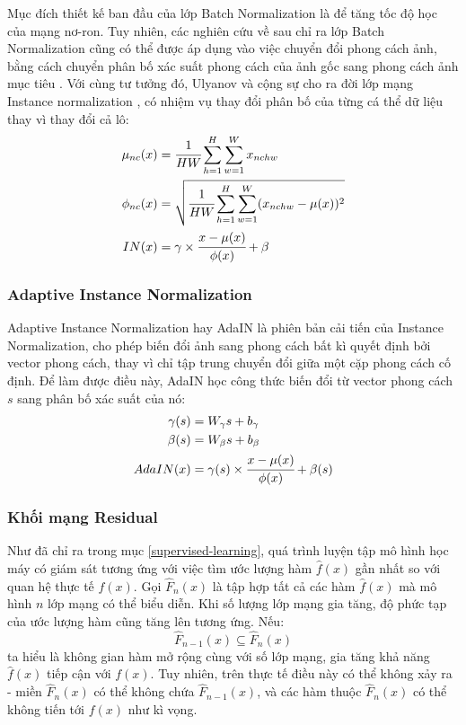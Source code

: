 \documentclass[12pt]{extreport}
\begin{document}
Mục đích thiết kế ban đầu của lớp Batch Normalization là để tăng tốc độ học của mạng nơ-ron. Tuy nhiên, các nghiên cứu về sau chỉ ra lớp Batch Normalization cũng có thể được áp dụng vào việc chuyển đổi phong cách ảnh, bằng cách chuyển phân bố xác suất phong cách của ảnh gốc sang phong cách ảnh mục tiêu \cite{radford2015unsupervised}. Với cùng tư tưởng đó, Ulyanov và cộng sự cho ra đời lớp mạng Instance normalization \cite{DBLP:journals/corr/UlyanovVL16}, có nhiệm vụ thay đổi phân bố của từng cá thể dữ liệu thay vì thay đổi cả lô:
\begin{align*}
    \mu_{nc}(x)  & = \cfrac{1}{HW} \sum_{h = 1}^{H} \sum_{w = 1}^{W} x_{nchw}                     \\
    \phi_{nc}(x) & = \sqrt{\cfrac{1}{HW} \sum_{h = 1}^{H} \sum_{w = 1}^{W} (x_{nchw} - \mu(x))^2} \\
    IN(x)        & = \gamma \times \cfrac{x - \mu(x)}{\phi(x)} + \beta
\end{align*}

\subsubsection{Adaptive Instance Normalization}

Adaptive Instance Normalization hay AdaIN là phiên bản cải tiến của Instance Normalization, cho phép biến đổi ảnh sang phong cách bất kì quyết định bởi vector phong cách, thay vì chỉ tập trung chuyển đổi giữa một cặp phong cách cố định. Để làm được điều này, AdaIN học công thức biến đổi từ vector phong cách $ s $ sang phân bố xác suất của nó:
\begin{align*}
    \gamma(s) & = W_{\gamma}s + b_{\gamma}                                \\
    \beta(s)  & = W_{\beta}s + b_{\beta}                                  \\
    AdaIN(x)  & = \gamma(s) \times \cfrac{x - \mu(x)}{\phi(x)} + \beta(s)
\end{align*}

\subsubsection{Khối mạng Residual}

Như đã chỉ ra trong mục \ref{supervised-learning}, quá trình luyện tập mô hình học máy có giám sát tương ứng với việc tìm ước lượng hàm $ \hat{f}(x) $ gần nhất so với quan hệ thực tế $ f(x) $. Gọi $ \hat{F}_n(x) $ là tập hợp tất cả các hàm $ \hat{f}(x) $ mà mô hình $ n $ lớp mạng có thể biểu diễn. Khi số lượng lớp mạng gia tăng, độ phức tạp của ước lượng hàm cũng tăng lên tương ứng. Nếu:
\begin{equation}
    \hat{F}_{n-1}(x) \subseteq \hat{F}_n(x)
    \label{eq:res}
\end{equation}
ta hiểu là không gian hàm mở rộng cùng với số lớp mạng, gia tăng khả năng $ \hat{f}(x) $ tiếp cận với $ f(x) $. Tuy nhiên, trên thực tế điều này có thể không xảy ra - miền $ \hat{F}_n(x) $ có thể không chứa $ \hat{F}_{n-1}(x) $, và các hàm thuộc $ \hat{F}_n(x) $ có thể không tiến tới $ f(x) $ như kì vọng.
\end{document}
